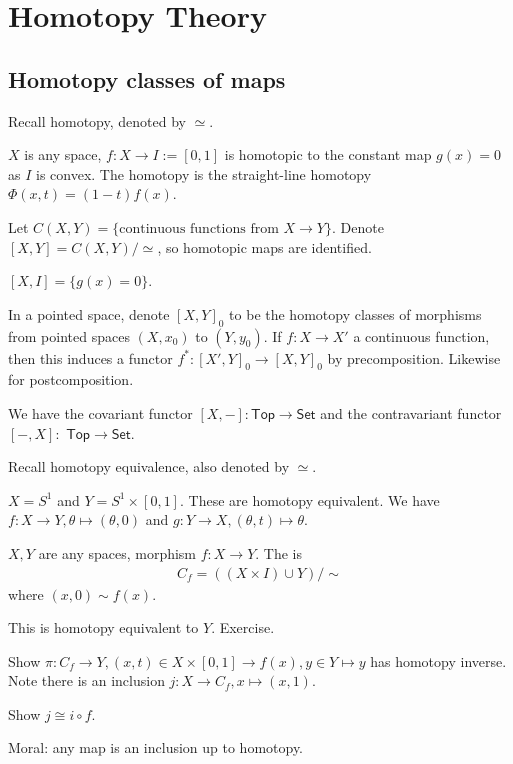 \documentclass[12pt,class=article,crop=false]{standalone}
\begin{document}
\section{Homotopy Theory}
\subsection{Homotopy classes of maps}
Recall homotopy, denoted by $ \simeq$.
\begin{eg}
	$ X$ is any space, $ f: X \to I:=[0,1]$ is homotopic to the constant map $ g(x) =0$ as $ I$ is convex. The homotopy is the straight-line homotopy $ \Phi(x,t)=(1-t)f(x)$.
\end{eg}

Let $ C(X,Y) = \{ \text{continuous functions from } X \to Y \}$. Denote $ [X,Y] = C(X,Y) /\simeq $, so homotopic maps are identified.

\begin{eg}
	$ [X,I] = \{g(x)=0\}$.
\end{eg}

In a pointed space, denote $ [X,Y]_0$ to be the homotopy classes of morphisms from pointed spaces  $ (X,x_0)$ to $(Y,y_0) $. If $ f:X \to X'$ a continuous function, then this induces a functor $ f^* : [X',Y]_0 \to [X,Y]_0$ by precomposition. Likewise for postcomposition.

We have the covariant functor $ [X, - ]: \textsf{Top} \to \textsf{Set} $ and the contravariant functor $ [-,X]: \textsf{ Top} \to \textsf{Set}$.

Recall homotopy equivalence, also denoted by $ \simeq$.

\begin{eg}
	$ X = S^{1}$ and $ Y=S^{1} \times [0,1]$. These are homotopy equivalent. We have $ f: X \to Y, \theta \mapsto (\theta,0)$ and $ g:Y \to X, (\theta,t) \mapsto \theta$.
\end{eg}
\begin{eg}
$ X,Y$ are any spaces, morphism $ f: X \to Y$. The  is
\begin{align*}
	C_f= ((X \times I) \cup Y) / \sim
\end{align*}
where $ (x,0) \sim f(x)$.

This is homotopy equivalent to  $ Y$. Exercise. 

Show $ \pi: C_f \to Y, (x,t) \in X \times [0,1] \to f(x), y \in Y \mapsto y$ has homotopy inverse. Note there is an inclusion $ j : X \to C_f, x \mapsto (x,1)$.

Show $ j \cong  i \circ f$.

Moral: any map is an inclusion up to homotopy.
\end{eg}
\end{document}
